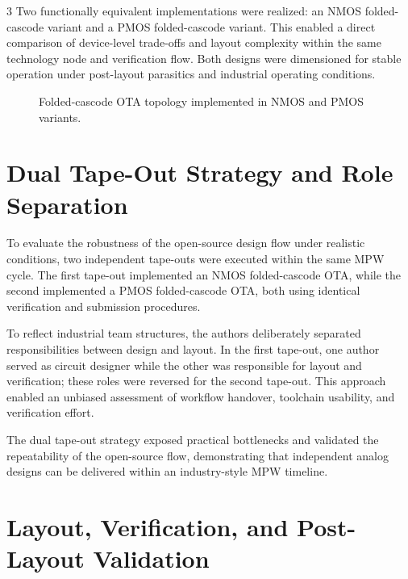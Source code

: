 \documentclass[a0,portrait,ruledsections]{sciposter}
\begin{document}
\begin{multicols}{3}
Two functionally equivalent implementations were realized: an NMOS
folded-cascode variant and a PMOS folded-cascode variant. This enabled a
direct comparison of device-level trade-offs and layout complexity within
the same technology node and verification flow. Both designs were
dimensioned for stable operation under post-layout parasitics and
industrial operating conditions.

\begin{figure}
\centering

\caption{Folded-cascode OTA topology implemented in NMOS and PMOS variants.}
\label{fig:foldedcascode}
\end{figure}



\section{Dual Tape-Out Strategy and Role Separation}

To evaluate the robustness of the open-source design flow under realistic
conditions, two independent tape-outs were executed within the same MPW
cycle. The first tape-out implemented an NMOS folded-cascode OTA, while
the second implemented a PMOS folded-cascode OTA, both using identical
verification and submission procedures.

To reflect industrial team structures, the authors deliberately separated
responsibilities between design and layout. In the first tape-out, one
author served as circuit designer while the other was responsible for
layout and verification; these roles were reversed for the second tape-out.
This approach enabled an unbiased assessment of workflow handover,
toolchain usability, and verification effort.

The dual tape-out strategy exposed practical bottlenecks and validated the
repeatability of the open-source flow, demonstrating that independent
analog designs can be delivered within an industry-style MPW timeline.


\section{Layout, Verification, and Post-Layout Validation}


\end{multicols}
\end{document}
